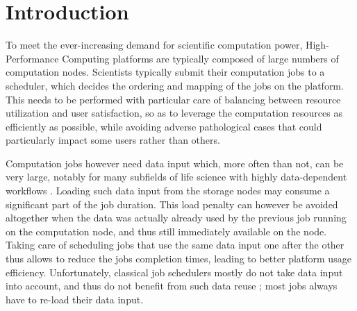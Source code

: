 \documentclass[sigconf,review,anonymous]{acmart}
\newcommand{\rev}[1]{{\color{blue}{#1}}}
\begin{document}
\begin{abstract}
  

\end{abstract}

\maketitle

\section{Introduction}\label{sec.introduction}

To meet the ever-increasing demand for scientific computation power,
High-Performance Computing platforms are typically composed of large
numbers of computation nodes. Scientists typically submit their
computation jobs to a scheduler, which decides the ordering and mapping
of the jobs on the platform. This needs to be performed with particular
care of balancing between resource utilization and user satisfaction, so
as to leverage the computation resources as efficiently as possible,
while avoiding adverse pathological cases that could particularly impact
some users rather than others.

Computation jobs however need data input which, more often than not, can
be very large, notably for many subfields of life science with highly
data-dependent workflows \rev{like taxonomic identification of DNA fragments, genome alignments or ancestral reconstructions}. Loading such data input from the storage
nodes may consume a significant part of the job duration. This load
penalty can however be avoided altogether when the data was actually
already used by the previous job running on the computation node, and
thus still immediately available on the node. Taking care of scheduling
jobs that use the same data input one after the other thus allows to
reduce the jobs completion times, leading to better platform usage
efficiency. Unfortunately, classical job schedulers mostly do not take
data input into account, and thus do not benefit from such data reuse ;
most jobs always have to re-load their data input.
\end{document}
